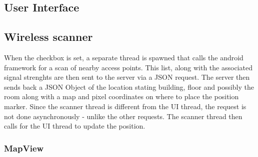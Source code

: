 \subsection{User Interface}

\subsection{Wireless scanner}
When the checkbox is set, a separate thread is spawned that calls the android framework for a scan of nearby access points. This list, along with the associated signal strenghts are then sent to the server via a JSON request. The server then sends back a JSON Object of the location stating building, floor and possibly the room along with a map and pixel coordinates on where to place the position marker. Since the scanner thread is different from the UI thread, the request is not done asynchronously - unlike the other requests. The scanner thread then calls for the UI thread to update the position.

\subsubsection{MapView}

